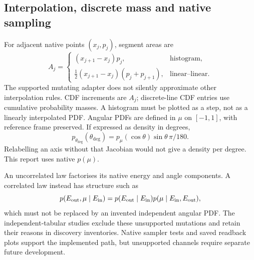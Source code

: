 \subsection{Interpolation, discrete mass and native sampling}
For adjacent native points $(x_j,p_j)$, segment areas are
\begin{equation}
A_j=\begin{cases}
(x_{j+1}-x_j)p_j,&\text{histogram},\\
\frac12(x_{j+1}-x_j)(p_j+p_{j+1}),&\text{linear--linear}.
\end{cases}\label{eq:areas}
\end{equation}
The supported mutating adapter does not silently approximate other interpolation rules. CDF increments are $A_j$; discrete-line CDF entries use cumulative probability masses. A histogram must be plotted as a step, not as a linearly interpolated PDF. Angular PDFs are defined in $\mu$ on $[-1,1]$, with reference frame preserved. If expressed as density in degrees,
\begin{equation}
p_{\theta_{\deg}}(\theta_{\deg})=p_\mu(\cos\theta)\sin\theta\,\pi/180.
\end{equation}
Relabelling an axis without that Jacobian would not give a density per degree. This report uses native $p(\mu)$.

An uncorrelated law factorises its native energy and angle components. A correlated law instead has structure such as
\begin{equation}
p(E_{\rm out},\mu\mid E_{\rm in})=p(E_{\rm out}\mid E_{\rm in})p(\mu\mid E_{\rm in},E_{\rm out}),
\end{equation}
which must not be replaced by an invented independent angular PDF. The independent-tabular studies exclude these unsupported mutations and retain their reasons in discovery inventories. Native sampler tests and saved readback plots support the implemented path, but unsupported channels require separate future development.

